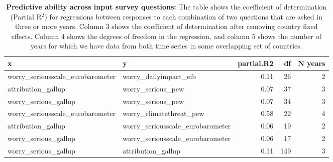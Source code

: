 \begin{table}[ht]
\centering
\begin{tabular}{llrrr}
  \hline
x & y & partial.R2 & df & N years \\ 
  \hline
worry\_seriousscale\_eurobarometer & worry\_dailyimpact\_eib & 0.11 &  26 &   2 \\ 
  attribution\_gallup & worry\_serious\_pew & 0.07 &  37 &   3 \\ 
  worry\_serious\_gallup & worry\_serious\_pew & 0.07 &  34 &   3 \\ 
  worry\_seriousscale\_eurobarometer & worry\_climatethreat\_pew & 0.58 &  22 &   4 \\ 
  attribution\_gallup & worry\_seriousscale\_eurobarometer & 0.06 &  19 &   2 \\ 
  worry\_serious\_gallup & worry\_seriousscale\_eurobarometer & 0.06 &  17 &   2 \\ 
  worry\_serious\_gallup & attribution\_gallup & 0.11 & 149 &   3 \\ 
   \hline
\end{tabular}
\caption{{\bf Predictive ability across input survey questions:} The table shows the coefficient of determination (Partial R$^2$) 
                    for regressions between responses to each combination of two questions that are asked in three or more years. 
                    Column 3 shows the coefficient of determination after removing country 
                  fixed effects. Column 4 shows the degrees of freedom in the regression, and column 5 shows the number of years for which we have 
                    data from both time series in some overlapping set of countries.} 
\label{tab:timeseries_inputs}
\end{table}
